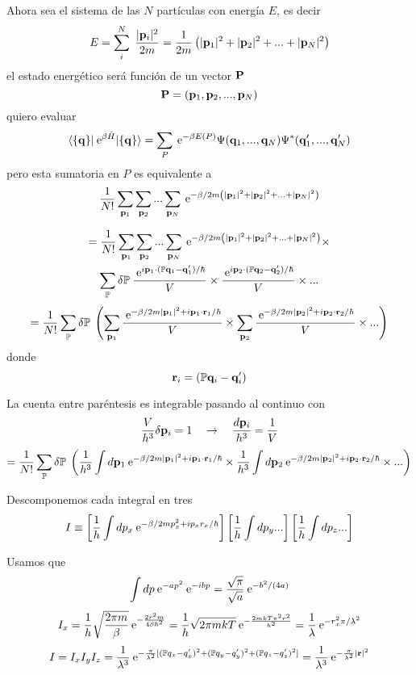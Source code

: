 \documentclass[10pt,oneside]{CBFT_book}
\begin{document}
Ahora sea el sistema de las $N$ partículas con energía $E$, es decir 
\[
	E = \sum_i^N \; \frac{|\vb{p}_i|^2}{2m} =
	\frac{1}{2m} \left( |\vb{p}_1|^2 + |\vb{p}_2|^2 + ... + |\vb{p}_N|^2 \right)
\]
el estado energético será función de un vector $\vb{P}$
\[
	\vb{P} = (\vb{p}_1, \vb{p}_2, ..., \vb{p}_N )
\]
quiero evaluar 
\[
	\braket{ \{ \vb{q} \} | \euler^{\beta \hat{H}} | \{ \vb{q} \} } =
	\sum_P \euler^{-\beta E(P)} \Psi (\vb{q}_1,..., \vb{q}_N ) \Psi^* (\vb{q}_1',..., \vb{q}_N' )
\]
pero esta sumatoria en $P$ es equivalente a 
\[
	\frac{1}{N!} \sum_{\vb{p}_1} \sum_{\vb{p}_2} ... \sum_{\vb{p}_N} 
	\euler^{-\beta/2m \left( |\vb{p}_1|^2 + |\vb{p}_2|^2 + ... + |\vb{p}_N|^2 \right)}
\]

\begin{multline*}
	= \frac{1}{N!} \sum_{\vb{p}_1} \sum_{\vb{p}_2} ... \sum_{\vb{p}_N} 
	\euler^{-\beta/2m \left( |\vb{p}_1|^2 + |\vb{p}_2|^2 + ... + |\vb{p}_N|^2 \right)} \times \\ 
	\sum_{ \mathbb{P} } \delta\mathbb{P} \: \frac{\euler^{ i \vb{p}_1 \cdot ( \mathbb{P}\vb{q}_1 - \vb{q}_1')/ 
	\hbar} }{V} \times \frac{\euler^{ i \vb{p}_2 \cdot ( \mathbb{P}\vb{q}_2 - \vb{q}_2' )/\hbar} }{V}\times ...
\end{multline*}
\[
	= \frac{1}{N!}\sum_{ \mathbb{P} } \delta\mathbb{P} \: \left( 
	\sum_{\vb{p}_1} \frac{\euler^{ -\beta/2m|\vb{p}_1|^2 + i \vb{p}_1 \cdot \vb{r}_1/ \hbar} }{V} \times 
	\sum_{\vb{p}_2} \frac{\euler^{ -\beta/2m|\vb{p}_2|^2 + i \vb{p}_2 \cdot \vb{r}_2/ \hbar} }{V} \times ...
	\right)
\]
donde 
\[
	\vb{r}_i = ( \mathbb{P}\vb{q}_i - \vb{q}_i')
\]

La cuenta entre paréntesis es integrable pasando al continuo con 
\[
	\frac{V}{h^3} \delta \vb{p}_i = 1 \quad \rightarrow \quad \frac{d\vb{p}_i}{h^3} = \frac{1}{V}
\]
\[
	= \frac{1}{N!} \sum_{ \mathbb{P} } \delta\mathbb{P} \: \left( 
	\frac{1}{h^3} \int d\vb{p}_1 \euler^{ -\beta/2m|\vb{p}_1|^2 + i \vb{p}_1 \cdot \vb{r}_1/ \hbar} \times 
	\frac{1}{h^3} \int d\vb{p}_2 \euler^{ -\beta/2m|\vb{p}_2|^2 + i \vb{p}_2 \cdot \vb{r}_2/ \hbar} \times ...
	\right)
\]

Descomponemos cada integral en tres
\[
	I \equiv \left[ \frac{1}{h} \int dp_x \:\mathrm{e}^{ -\beta/2m p_x^2 + i p_x r_x/ \hbar} \right] 
	\left[ \frac{1}{h} \int dp_y ... \right] \left[ \frac{1}{h} \int dp_z ... \right]
\]

Usamos que 
\[
	\int dp \:\mathrm{e}^{-ap^2} \:\mathrm{e}^{-ibp} = \frac{\sqrt{\pi}}{\sqrt{a}} \:\mathrm{e}^{-b^2/(4a)}
\]
\[
	I_x = \frac{1}{h} \sqrt{\frac{2\pi m}{\beta}} \:\mathrm{e}^{-\frac{2r^2m}{4\beta \hbar^2}} =
	\frac{1}{h} \sqrt{2\pi m kT} \:\mathrm{e}^{-\frac{2mkT\pi^2 r^2}{h^2}} = 
	\frac{1}{\lambda} \:\mathrm{e}^{-r_x^2\pi /\lambda^2}
\]
\[
	I = I_x I_y I_z = \frac{1}{\lambda^3} \euler^{ -\frac{\pi}{\lambda^2}
	[ (\mathbb{P}q_x-q_x')^2 + (\mathbb{P}q_y-q_y')^2 + (\mathbb{P}q_z-q_z')^2 ]} = 
	\frac{1}{\lambda^3} \euler^{ -\frac{\pi}{\lambda^2} |\vb{r}|^2 }
\]
\end{document}
